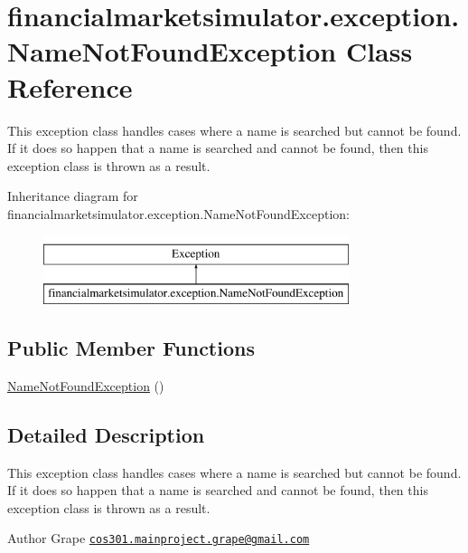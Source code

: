 \hypertarget{classfinancialmarketsimulator_1_1exception_1_1_name_not_found_exception}{\section{financialmarketsimulator.\+exception.\+Name\+Not\+Found\+Exception Class Reference}
\label{classfinancialmarketsimulator_1_1exception_1_1_name_not_found_exception}
}


This exception class handles cases where a name is searched but cannot be found. If it does so happen that a name is searched and cannot be found, then this exception class is thrown as a result.  


Inheritance diagram for financialmarketsimulator.\+exception.\+Name\+Not\+Found\+Exception\+:\begin{figure}[H]
\begin{center}
\leavevmode
\includegraphics[height=2.000000cm]{classfinancialmarketsimulator_1_1exception_1_1_name_not_found_exception}
\end{center}
\end{figure}
\subsection*{Public Member Functions}
\begin{DoxyCompactItemize}
\item 
\hyperlink{classfinancialmarketsimulator_1_1exception_1_1_name_not_found_exception_a5848cc445b16caec644e5e2ace1d9f18}{Name\+Not\+Found\+Exception} ()
\end{DoxyCompactItemize}


\subsection{Detailed Description}
This exception class handles cases where a name is searched but cannot be found. If it does so happen that a name is searched and cannot be found, then this exception class is thrown as a result. 

\begin{DoxyAuthor}{Author}
Grape \href{mailto:cos301.mainproject.grape@gmail.com}{\tt cos301.\+mainproject.\+grape@gmail.\+com} 
\end{DoxyAuthor}


